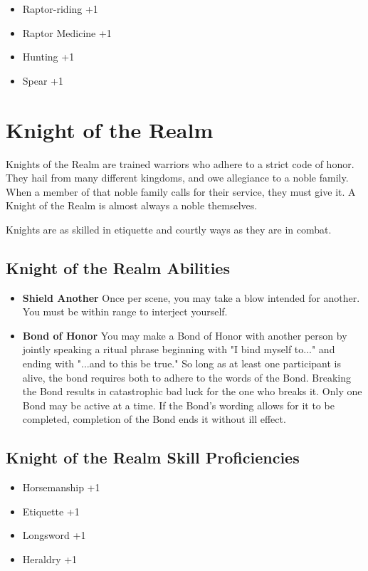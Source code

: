 \begin{multicols}{2}
\begin{itemize}
    \item Raptor-riding +1
    \item Raptor Medicine +1
    \item Hunting +1
    \item Spear +1
\end{itemize}

\section{Knight of the Realm}

Knights of the Realm are trained warriors who adhere to a strict code of 
honor. They hail from many different kingdoms, and owe allegiance to a 
noble family. When a member of that noble family calls for their service, 
they must give it. A Knight of the Realm is almost always a noble themselves.

Knights are as skilled in etiquette and courtly ways as they are in combat.

\subsection{Knight of the Realm Abilities}

\begin{itemize}
    \item \textbf{Shield Another} Once per scene, you may take a blow 
    intended for another. You must be within range to interject yourself.
    \item \textbf{Bond of Honor} You may make a Bond of Honor with another 
    person by jointly speaking a ritual phrase beginning with "I bind myself 
    to..." and ending with "...and to this be true." So long as at least one 
    participant is alive, the bond requires both to adhere to the words of 
    the Bond. Breaking the Bond results in catastrophic bad luck for the 
    one who breaks it. Only one Bond may be active at a time. If the Bond's 
    wording allows for it to be completed, completion of the Bond ends it 
    without ill effect.
\end{itemize}

\subsection{Knight of the Realm Skill Proficiencies}

\begin{itemize}
    \item Horsemanship +1
    \item Etiquette +1
    \item Longsword +1
    \item Heraldry +1
\end{itemize}


\end{multicols}
